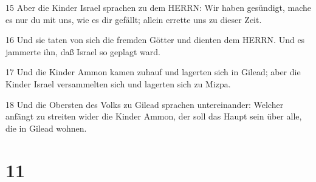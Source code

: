 \par 15 Aber die Kinder Israel sprachen zu dem HERRN: Wir haben gesündigt, mache es nur du mit uns, wie es dir gefällt; allein errette uns zu dieser Zeit.
\par 16 Und sie taten von sich die fremden Götter und dienten dem HERRN. Und es jammerte ihn, daß Israel so geplagt ward.
\par 17 Und die Kinder Ammon kamen zuhauf und lagerten sich in Gilead; aber die Kinder Israel versammelten sich und lagerten sich zu Mizpa.
\par 18 Und die Obersten des Volks zu Gilead sprachen untereinander: Welcher anfängt zu streiten wider die Kinder Ammon, der soll das Haupt sein über alle, die in Gilead wohnen.

\chapter{11}

